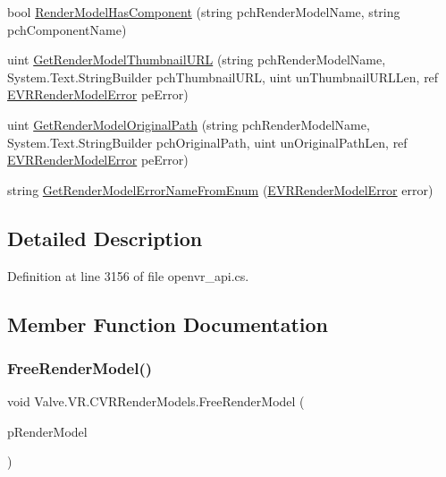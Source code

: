 \begin{DoxyCompactItemize}
\item 
bool \mbox{\hyperlink{class_valve_1_1_v_r_1_1_c_v_r_render_models_accd21964d7bf57ddddee33251dd38701}{Render\+Model\+Has\+Component}} (string pch\+Render\+Model\+Name, string pch\+Component\+Name)
\item 
uint \mbox{\hyperlink{class_valve_1_1_v_r_1_1_c_v_r_render_models_a3b4303443fb1a0ab9b5688f6cf1811b8}{Get\+Render\+Model\+Thumbnail\+U\+RL}} (string pch\+Render\+Model\+Name, System.\+Text.\+String\+Builder pch\+Thumbnail\+U\+RL, uint un\+Thumbnail\+U\+R\+L\+Len, ref \mbox{\hyperlink{namespace_valve_1_1_v_r_ac95dda09bbb588fd83a8ac0ba3c82266}{E\+V\+R\+Render\+Model\+Error}} pe\+Error)
\item 
uint \mbox{\hyperlink{class_valve_1_1_v_r_1_1_c_v_r_render_models_a5a20531712ff8070bb1bbc02ae7b36fd}{Get\+Render\+Model\+Original\+Path}} (string pch\+Render\+Model\+Name, System.\+Text.\+String\+Builder pch\+Original\+Path, uint un\+Original\+Path\+Len, ref \mbox{\hyperlink{namespace_valve_1_1_v_r_ac95dda09bbb588fd83a8ac0ba3c82266}{E\+V\+R\+Render\+Model\+Error}} pe\+Error)
\item 
string \mbox{\hyperlink{class_valve_1_1_v_r_1_1_c_v_r_render_models_aa930abc30e6fdb3f7dbc438cda44b6b1}{Get\+Render\+Model\+Error\+Name\+From\+Enum}} (\mbox{\hyperlink{namespace_valve_1_1_v_r_ac95dda09bbb588fd83a8ac0ba3c82266}{E\+V\+R\+Render\+Model\+Error}} error)
\end{DoxyCompactItemize}


\subsection{Detailed Description}


Definition at line 3156 of file openvr\+\_\+api.\+cs.



\subsection{Member Function Documentation}
\mbox{\label{class_valve_1_1_v_r_1_1_c_v_r_render_models_ad36fe11f2fe3aeac575a5e48daaa12e1}} 
\subsubsection{\texorpdfstring{FreeRenderModel()}{FreeRenderModel()}}
{\footnotesize\ttfamily void Valve.\+V\+R.\+C\+V\+R\+Render\+Models.\+Free\+Render\+Model (\begin{DoxyParamCaption}\item[{Int\+Ptr}]{p\+Render\+Model }\end{DoxyParamCaption})}



